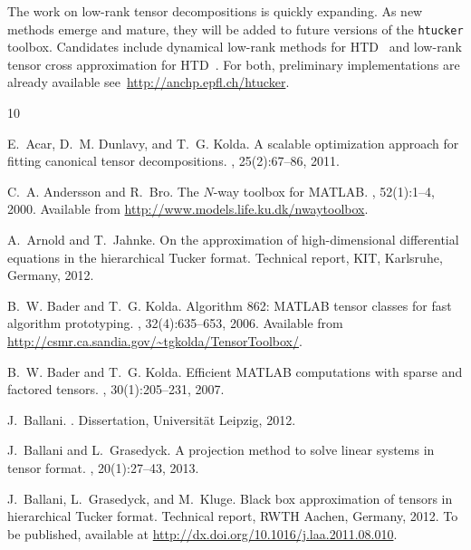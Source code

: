 \documentclass[11pt, a4paper]{article}
\newcommand{\htucker}{{\tt htucker}}
\begin{document}
The work on low-rank tensor decompositions is quickly expanding. As new methods emerge
and mature, they will be added to future versions of the \htucker{} toolbox.
Candidates include dynamical low-rank methods for HTD~\cite{Arnold2012,Lubich2012} and 
low-rank tensor cross approximation for HTD~\cite{Ballani2012c,Ballani2012a}. For both, preliminary implementations are already available
see~\url{http://anchp.epfl.ch/htucker}.

\begin{thebibliography}{10}

E.~Acar, D.~M. Dunlavy, and T.~G. Kolda.
\newblock A scalable optimization approach for fitting canonical tensor
  decompositions.
, 25(2):67--86, 2011.

C.~A. Andersson and R.~Bro.
\newblock The {$N$-way} toolbox for {MATLAB}.
, 52(1):1--4,
  2000.
\newblock Available from \url{http://www.models.life.ku.dk/nwaytoolbox}.

A.~Arnold and T.~Jahnke.
\newblock On the approximation of high-dimensional differential equations in
  the hierarchical {T}ucker format.
\newblock Technical report, KIT, Karlsruhe, Germany, 2012.

B.~W. Bader and T.~G. Kolda.
\newblock Algorithm 862: {MATLAB} tensor classes for fast algorithm
  prototyping.
, 32(4):635--653, 2006.
\newblock Available from
  \url{http://csmr.ca.sandia.gov/~tgkolda/TensorToolbox/}.

B.~W. Bader and T.~G. Kolda.
\newblock Efficient {MATLAB} computations with sparse and factored tensors.
, 30(1):205--231, 2007.

J.~Ballani.
.
\newblock Dissertation, Universit\"at Leipzig, 2012.

J.~Ballani and L.~Grasedyck.
\newblock A projection method to solve linear systems in tensor format.
, 20(1):27--43, 2013.

J.~Ballani, L.~Grasedyck, and M.~Kluge.
\newblock Black box approximation of tensors in hierarchical {T}ucker format.
\newblock Technical report, RWTH Aachen, Germany, 2012.
\newblock To be published, available at
  \url{http://dx.doi.org/10.1016/j.laa.2011.08.010}.


\end{thebibliography}
\end{document}
